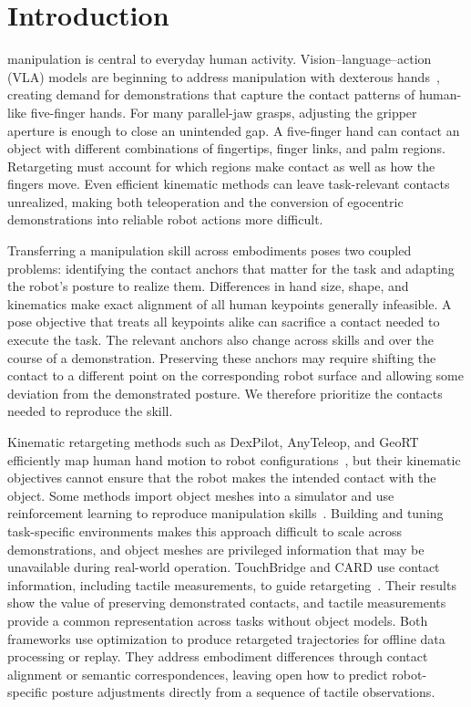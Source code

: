 \section{Introduction}
\label{sec:introduction}

 manipulation is central to everyday human activity. Vision--language--action (VLA) models are beginning to address manipulation with dexterous hands~\cite{wen2025dexvla}, creating demand for demonstrations that capture the contact patterns of human-like five-finger hands. For many parallel-jaw grasps, adjusting the gripper aperture is enough to close an unintended gap. A five-finger hand can contact an object with different combinations of fingertips, finger links, and palm regions. Retargeting must account for which regions make contact as well as how the fingers move. Even efficient kinematic methods can leave task-relevant contacts unrealized, making both teleoperation and the conversion of egocentric demonstrations into reliable robot actions more difficult.

Transferring a manipulation skill across embodiments poses two coupled problems: identifying the contact anchors that matter for the task and adapting the robot's posture to realize them. Differences in hand size, shape, and kinematics make exact alignment of all human keypoints generally infeasible. A pose objective that treats all keypoints alike can sacrifice a contact needed to execute the task. The relevant anchors also change across skills and over the course of a demonstration.
Preserving these anchors may require shifting the contact to a different point on the corresponding robot surface and allowing some deviation from the demonstrated posture. We therefore prioritize the contacts needed to reproduce the skill.

Kinematic retargeting methods such as DexPilot, AnyTeleop, and GeoRT efficiently map human hand motion to robot configurations~\cite{handa2019dexpilot,qin2023anyteleop,yin2025geort}, but their kinematic objectives cannot ensure that the robot makes the intended contact with the object. Some methods import object meshes into a simulator and use reinforcement learning to reproduce manipulation skills~\cite{mandi2025dexmachina}. Building and tuning task-specific environments makes this approach difficult to scale across demonstrations, and object meshes are privileged information that may be unavailable during real-world operation. TouchBridge and CARD use contact information, including tactile measurements, to guide retargeting~\cite{zhang2026touchbridge,dai2026card}. Their results show the value of preserving demonstrated contacts, and tactile measurements provide a common representation across tasks without object models. Both frameworks use optimization to produce retargeted trajectories for offline data processing or replay. They address embodiment differences through contact alignment or semantic correspondences, leaving open how to predict robot-specific posture adjustments directly from a sequence of tactile observations.

